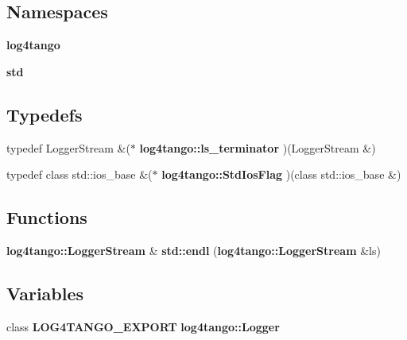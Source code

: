 \subsection*{Namespaces}
\begin{DoxyCompactItemize}
\item 
{\bf log4tango}
\item 
{\bf std}
\end{DoxyCompactItemize}
\subsection*{Typedefs}
\begin{DoxyCompactItemize}
\item 
typedef Logger\-Stream \&($\ast$ {\bf log4tango\-::ls\-\_\-terminator} )(Logger\-Stream \&)
\item 
typedef class std\-::ios\-\_\-base \&($\ast$ {\bf log4tango\-::\-Std\-Ios\-Flag} )(class std\-::ios\-\_\-base \&)
\end{DoxyCompactItemize}
\subsection*{Functions}
\begin{DoxyCompactItemize}
\item 
{\bf log4tango\-::\-Logger\-Stream} \& {\bf std\-::endl} ({\bf log4tango\-::\-Logger\-Stream} \&ls)
\end{DoxyCompactItemize}
\subsection*{Variables}
\begin{DoxyCompactItemize}
\item 
class {\bf L\-O\-G4\-T\-A\-N\-G\-O\-\_\-\-E\-X\-P\-O\-R\-T} {\bf log4tango\-::\-Logger}
\end{DoxyCompactItemize}
